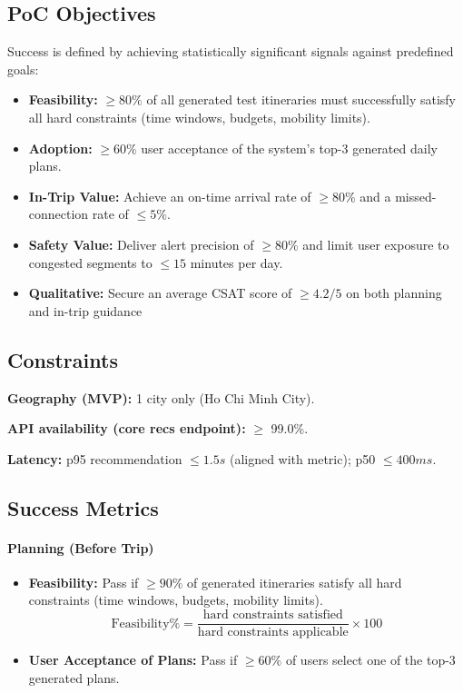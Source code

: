 \subsection{PoC Objectives}
Success is defined by achieving statistically significant signals against predefined goals: 
\begin{itemize}
    \item \textbf{Feasibility:} $\geq80\%$ of all generated test itineraries must successfully satisfy all hard constraints (time windows, budgets, mobility limits).
    \item \textbf{Adoption:} $\geq60\%$ user acceptance of the system’s top-3 generated daily plans.
    \item \textbf{In-Trip Value:} Achieve an on-time arrival rate of $\geq80\%$ and a missed-connection rate of $\leq5\%$.
    \item \textbf{Safety Value:} Deliver alert precision of $\geq80\%$ and limit user exposure to congested segments to $\leq15$ minutes per day.
    \item \textbf{Qualitative:} Secure an average CSAT score of $\geq4.2/5$ on both planning and in-trip guidance
\end{itemize}


\subsection{Constraints}
\textbf{Geography (MVP):} 1 city only (Ho Chi Minh City).

\textbf{API availability (core recs endpoint):} $\geq$ 99.0\%.

\textbf{Latency:} p95 recommendation $\leq 1.5 s$ (aligned with metric); p50 $\leq 400 ms$.
\subsection{Success Metrics}
\paragraph{\textbf{Planning (Before Trip)}}
\begin{itemize}
	\item \textbf{Feasibility:} Pass if $\ge 90\%$ of generated itineraries satisfy all hard constraints (time windows, budgets, mobility limits).\\
	\[\text{Feasibility\%} = \frac{\text{hard constraints satisfied}}{\text{hard constraints applicable}} \times 100\]
	\item \textbf{User Acceptance of Plans:} Pass if $\ge 60\%$ of users select one of the top-3 generated plans.
\end{itemize}

